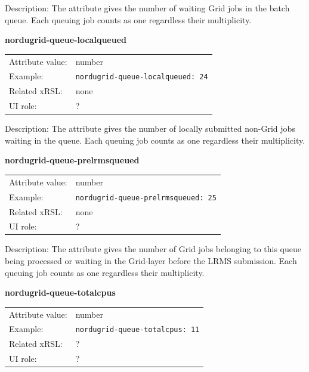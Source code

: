 \documentclass{article}
\begin{document}
Description: The attribute gives the number of waiting Grid jobs in the batch queue. 
Each queuing job counts as one regardless their multiplicity. 

  \hspace*{0.5cm}
  \begin{shaded}
    \textbf{nordugrid-queue-localqueued}
  \end{shaded}
  \begin{tabular}{lp{10cm}}  
    Attribute value:& number\\
    Example:& \verb#nordugrid-queue-localqueued: 24#\\
    Related xRSL:& none\\
    UI role:& ?\\
  \end{tabular}

Description: The attribute gives the number of locally submitted non-Grid jobs
waiting in the queue. Each queuing job counts as one regardless their 
multiplicity. 

  \hspace*{0.5cm}
  \begin{shaded}
    \textbf{nordugrid-queue-prelrmsqueued}
  \end{shaded}
  \begin{tabular}{lp{10cm}}  
    Attribute value:& number\\
    Example:& \verb#nordugrid-queue-prelrmsqueued: 25#\\
    Related xRSL:& none\\
    UI role:& ?\\
  \end{tabular}

Description: The attribute gives the number of Grid jobs belonging to this 
queue being processed or waiting in the Grid-layer before the LRMS submission.
Each queuing job counts as one regardless their multiplicity. 

  \hspace*{0.5cm}
  \begin{shaded}
    \textbf{nordugrid-queue-totalcpus}
  \end{shaded}
  \begin{tabular}{lp{10cm}}  
    Attribute value:& number\\
    Example:& \verb#nordugrid-queue-totalcpus: 11#\\
    Related xRSL:& ?\\
    UI role:& ?\\    
  \end{tabular}
\end{document}
